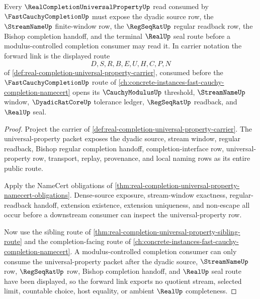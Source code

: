 \begin{theorem}
\label{thm:real-completion-universal-property-forward-link}
Every $\RealCompletionUniversalPropertyUp$ read consumed by $\FastCauchyCompletionUp$ must expose the dyadic source row, the $\StreamNameUp$ finite-window row, the $\RegSeqRatUp$ regular readback row, the Bishop completion handoff, and the terminal $\RealUp$ seal route before a modulus-controlled completion consumer may read it. In carrier notation the forward link is the displayed route
$$
D,S,R,B,E,U,H,C,P,N
$$
of \autoref{def:real-completion-universal-property-carrier}, consumed before the $\FastCauchyCompletionUp$ route of \autoref{ch:concrete-instances-fast-cauchy-completion-namecert} opens its $\CauchyModulusUp$ threshold, $\StreamNameUp$ window, $\DyadicRatCoreUp$ tolerance ledger, $\RegSeqRatUp$ readback, and $\RealUp$ seal.
\end{theorem}
\begin{proof}
Project the carrier of \autoref{def:real-completion-universal-property-carrier}. The universal-property packet exposes the dyadic source, stream window, regular readback, Bishop regular completion handoff, completion-interface row, universal-property row, transport, replay, provenance, and local naming rows as its entire public route.

Apply the NameCert obligations of \autoref{thm:real-completion-universal-property-namecert-obligations}. Dense-source exposure, stream-window exactness, regular-readback handoff, extension existence, extension uniqueness, and non-escape all occur before a downstream consumer can inspect the universal-property row.

Now use the sibling route of \autoref{thm:real-completion-universal-property-sibling-route} and the completion-facing route of \autoref{ch:concrete-instances-fast-cauchy-completion-namecert}. A modulus-controlled completion consumer can only consume the universal-property packet after the dyadic source, $\StreamNameUp$ row, $\RegSeqRatUp$ row, Bishop completion handoff, and $\RealUp$ seal route have been displayed, so the forward link exports no quotient stream, selected limit, countable choice, host equality, or ambient $\RealUp$ completeness.
\end{proof}
